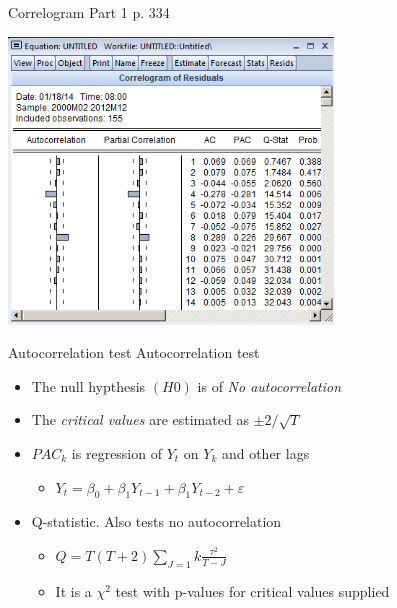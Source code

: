 \documentclass[14pt,xcolor=pdftex,dvipsnames,table]{beamer}\usepackage[]{graphicx}\usepackage[]{color}
\begin{document}
\begin{frame}{Correlogram Part 1 p. 334}
\graphicspath{{./Figures/}}
\begin{center}
\includegraphics[height = 3.0in]{Corr}
\end{center}


\begin{frame}{Autocorrelation test}
Autocorrelation test
\begin{itemize}[<+-| alert@+>]
\item The null hypthesis $(H0)$ is of \emph{No autocorrelation}
\item The \emph{critical values} are estimated as $\pm 2/ \sqrt{T}$
\item $PAC_k$ is regression of $Y_t$ on $Y_k$ and other lags
\begin{itemize}
\item $Y_t = \beta_0 + \beta_1 Y_{t-1} + \beta_1 Y_{t-2} + \varepsilon$
\end{itemize}
\item Q-statistic.  Also tests no autocorrelation 
\begin{itemize}
\item $Q = T(T + 2) \sum_{J = 1}{k} \frac{\tau^2}{T - J}$
\item It is a $\chi^2$ test with p-values for critical values supplied
\end{itemize}
\end{itemize}
\end{frame}


\end{frame}
\end{document}
